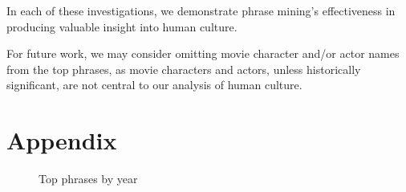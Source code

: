 \documentclass{article}
\begin{document}
\begin{multicols}{2}
In each of these investigations, we demonstrate phrase mining's effectiveness in producing valuable insight into human culture.

For future work, we may consider omitting movie character and/or actor names from the top phrases, as movie characters and actors, unless historically significant, are not central to our analysis of human culture.

\nocite{10.1145/2723372.2751523}


\section{Appendix} \label{appendix} %

\begin{figure}
\caption{Top phrases by year}
\centering
{}
\label{figure:top_phrases_by_year}
\end{figure}

\begin{figure}
\ContinuedFloat
\centering
{}
\end{figure}
\end{multicols}
\end{document}

